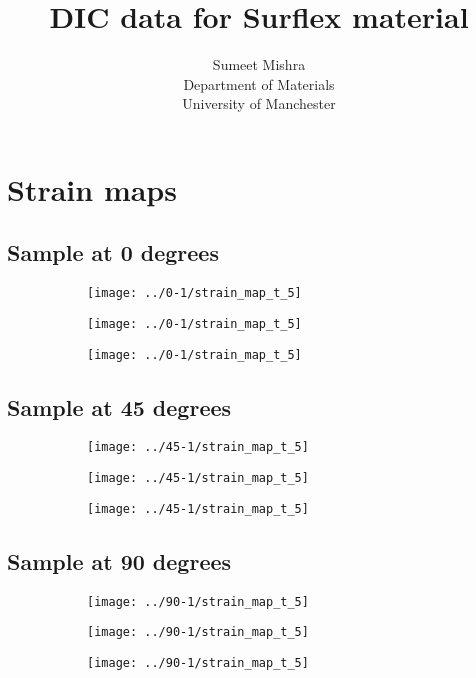 \documentclass[12pt]{article}
\title{DIC data for Surflex material}
\author{Sumeet Mishra \\ Department of Materials \\ University of Manchester}
\begin{document}
\maketitle

\section{Strain maps}

\subsection{Sample at 0 degrees}
\begin{figure}[H]
    \centering
    \begin{subfigure}[b]{0.31\textwidth}
        \texttt{[image: ../0-1/strain\_map\_t\_5]}
    \end{subfigure}
    \begin{subfigure}[b]{0.31\textwidth}
        \texttt{[image: ../0-1/strain\_map\_t\_5]}
    \end{subfigure}
    \begin{subfigure}[b]{0.31\textwidth}
        \texttt{[image: ../0-1/strain\_map\_t\_5]}
    \end{subfigure}
\end{figure}


\subsection{Sample at 45 degrees}
\begin{figure}[H]
    \centering
    \begin{subfigure}[b]{0.31\textwidth}
        \texttt{[image: ../45-1/strain\_map\_t\_5]}
    \end{subfigure}
    \begin{subfigure}[b]{0.31\textwidth}
        \texttt{[image: ../45-1/strain\_map\_t\_5]}
    \end{subfigure}
    \begin{subfigure}[b]{0.31\textwidth}
        \texttt{[image: ../45-1/strain\_map\_t\_5]}
    \end{subfigure}
\end{figure}

\subsection{Sample at 90 degrees}
\begin{figure}[H]
    \centering
    \begin{subfigure}[b]{0.31\textwidth}
        \texttt{[image: ../90-1/strain\_map\_t\_5]}
    \end{subfigure}
    \begin{subfigure}[b]{0.31\textwidth}
        \texttt{[image: ../90-1/strain\_map\_t\_5]}
    \end{subfigure}
    \begin{subfigure}[b]{0.31\textwidth}
        \texttt{[image: ../90-1/strain\_map\_t\_5]}
    \end{subfigure}
\end{figure}
\end{document}
